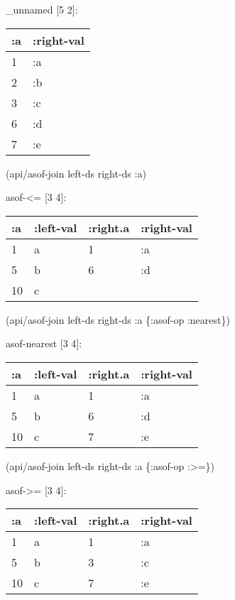 \documentclass[]{article}
\newenvironment{Shaded}{\begin{snugshade}}{\end{snugshade}}
\newcommand{\AttributeTok}[1]{\textcolor[rgb]{0.77,0.63,0.00}{#1}}
\newcommand{\NormalTok}[1]{#1}
\begin{document}
\_unnamed {[}5 2{]}:

\begin{longtable}[]{@{}ll@{}}
\toprule
:a & :right-val\tabularnewline
\midrule
\endhead
1 & :a\tabularnewline
2 & :b\tabularnewline
3 & :c\tabularnewline
6 & :d\tabularnewline
7 & :e\tabularnewline
\bottomrule
\end{longtable}

\begin{Shaded}
\begin{Highlighting}[]
\NormalTok{(api/asof-join left-ds right-ds }\AttributeTok{:a}\NormalTok{)}
\end{Highlighting}
\end{Shaded}

asof-\textless{}= {[}3 4{]}:

\begin{longtable}[]{@{}llll@{}}
\toprule
:a & :left-val & :right.a & :right-val\tabularnewline
\midrule
\endhead
1 & a & 1 & :a\tabularnewline
5 & b & 6 & :d\tabularnewline
10 & c & &\tabularnewline
\bottomrule
\end{longtable}

\begin{Shaded}
\begin{Highlighting}[]
\NormalTok{(api/asof-join left-ds right-ds }\AttributeTok{:a}\NormalTok{ \{}\AttributeTok{:asof-op} \AttributeTok{:nearest}\NormalTok{\})}
\end{Highlighting}
\end{Shaded}

asof-nearest {[}3 4{]}:

\begin{longtable}[]{@{}llll@{}}
\toprule
:a & :left-val & :right.a & :right-val\tabularnewline
\midrule
\endhead
1 & a & 1 & :a\tabularnewline
5 & b & 6 & :d\tabularnewline
10 & c & 7 & :e\tabularnewline
\bottomrule
\end{longtable}

\begin{Shaded}
\begin{Highlighting}[]
\NormalTok{(api/asof-join left-ds right-ds }\AttributeTok{:a}\NormalTok{ \{}\AttributeTok{:asof-op}\NormalTok{ :>=\})}
\end{Highlighting}
\end{Shaded}

asof-\textgreater{}= {[}3 4{]}:

\begin{longtable}[]{@{}llll@{}}
\toprule
:a & :left-val & :right.a & :right-val\tabularnewline
\midrule
\endhead
1 & a & 1 & :a\tabularnewline
5 & b & 3 & :c\tabularnewline
10 & c & 7 & :e\tabularnewline
\bottomrule
\end{longtable}
\end{document}
